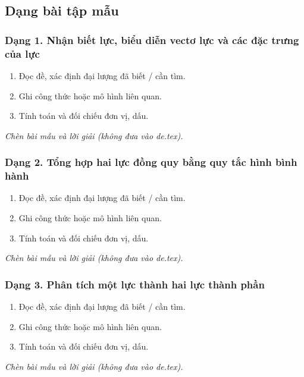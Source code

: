 

\subsection{Dạng bài tập mẫu}
\subsubsection{Dạng 1. Nhận biết lực, biểu diễn vectơ lực và các đặc trưng của lực}
\begin{phuongphap}
\begin{enumerate}
\item Đọc đề, xác định đại lượng đã biết / cần tìm.
\item Ghi công thức hoặc mô hình liên quan.
\item Tính toán và đối chiếu đơn vị, dấu.
\end{enumerate}
\end{phuongphap}
\begin{vidumau}
\textit{Chèn bài mẫu và lời giải (không đưa vào de.tex).}
\end{vidumau}

\subsubsection{Dạng 2. Tổng hợp hai lực đồng quy bằng quy tắc hình bình hành}
\begin{phuongphap}
\begin{enumerate}
\item Đọc đề, xác định đại lượng đã biết / cần tìm.
\item Ghi công thức hoặc mô hình liên quan.
\item Tính toán và đối chiếu đơn vị, dấu.
\end{enumerate}
\end{phuongphap}
\begin{vidumau}
\textit{Chèn bài mẫu và lời giải (không đưa vào de.tex).}
\end{vidumau}

\subsubsection{Dạng 3. Phân tích một lực thành hai lực thành phần}
\begin{phuongphap}
\begin{enumerate}
\item Đọc đề, xác định đại lượng đã biết / cần tìm.
\item Ghi công thức hoặc mô hình liên quan.
\item Tính toán và đối chiếu đơn vị, dấu.
\end{enumerate}
\end{phuongphap}
\begin{vidumau}
\textit{Chèn bài mẫu và lời giải (không đưa vào de.tex).}
\end{vidumau}

